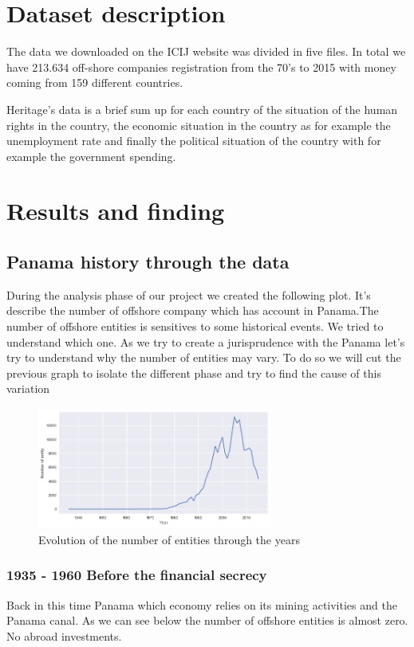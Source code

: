 \documentclass[11pt]{article}
\begin{document}
\section{Dataset description}
The data we downloaded on the ICIJ website was divided in five files. In total we have 213.634 off-shore companies registration from the 70's to 2015 with money coming from 159 different countries. 

Heritage's data is a brief sum up for each country of the situation of the human rights in the country, the economic situation in the country as for example the unemployment rate and finally the political situation of the country with for example the government spending. 

\section{Results and finding}
\subsection{Panama history through the data}

During the analysis phase of our project we created the following plot. It's describe the number of offshore company which has account in Panama.The number of offshore entities is sensitives to some historical events. We tried to understand which one. As we try to create a jurisprudence with the Panama let's try to understand why the number of entities may vary. To do so we will cut the previous graph to isolate the different phase and try to find the cause of this variation 
\begin{figure}[ht]
	\centering
    \includegraphics[width=7.7cm,height=4cm]{HistoricalContext}
    \caption{Evolution of the number of entities through the years}
    \label{fig:a}
\end{figure}

\subsubsection{1935 - 1960 Before the financial secrecy}
Back in this time Panama which economy relies on its mining activities and the Panama canal. As we can see below the number of offshore entities is almost zero. No abroad investments.
\end{document}
